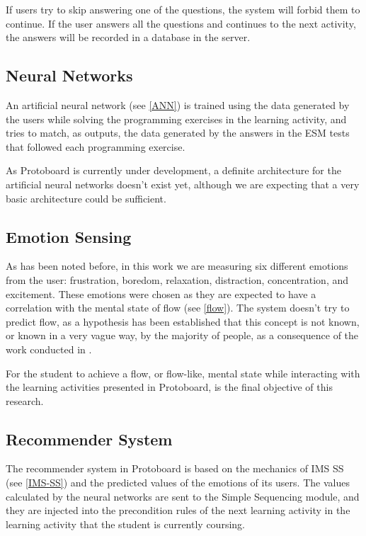 \documentclass{acm_proc_article-sp}
\begin{document}
If users try to skip answering one of the questions, the system
will forbid them to continue. If the user answers all the questions
and continues to the next activity, the answers will be recorded in a
database in the server.


\subsection{Neural Networks}

An artificial neural network (see \ref{ANN}) is trained using the data generated
by the users while solving the programming exercises in the learning
activity, and tries to match, as outputs, the data generated by the
answers in the ESM tests that followed each programming exercise.

As Protoboard is currently under development, a definite architecture
for the artificial neural networks doesn't exist yet, although we are
expecting that a very basic architecture could be sufficient.


\subsection{Emotion Sensing}

As has been noted before, in this work we are measuring six different
emotions from the user: frustration, boredom, relaxation, distraction,
concentration, and excitement. These emotions were chosen as they are
expected to have a correlation with the mental state of flow (see
\ref{flow}). The system doesn't try to predict flow, as a hypothesis
has been established that this concept is not known, or known in a
very vague way, by the majority of people, as a consequence of the
work conducted in \cite{hernandez2014automatic}.

For the student to achieve a flow, or flow-like, mental state while
interacting with the learning activities presented in Protoboard, is
the final objective of this research.


\subsection{Recommender System}

The recommender system in Protoboard is based on the mechanics of IMS
SS (see \ref{IMS-SS}) and the predicted values of the emotions of its
users. The values calculated by the neural networks are sent to the
Simple Sequencing module, and they are injected into the precondition
rules of the next learning activity in the learning activity that the student is
currently coursing.
\end{document}

